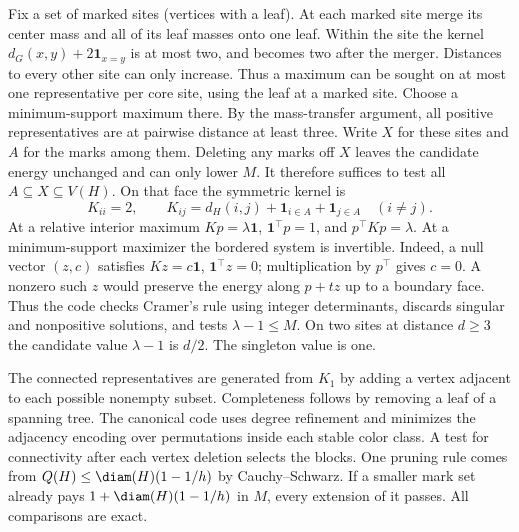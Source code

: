 \documentclass[11pt,a4paper]{article}
\begin{document}
Fix a set of marked sites (vertices with a leaf). At each marked site merge its center mass and all of its leaf masses onto one leaf. Within the site the kernel $d_G(x,y)+2\mathbf1_{x=y}$ is at most two, and becomes two after the merger. Distances to every other site can only increase. Thus a maximum can be sought on at most one representative per core site, using the leaf at a marked site. Choose a minimum-support maximum there. By the mass-transfer argument, all positive representatives are at pairwise distance at least three. Write $X$ for these sites and $A$ for the marks among them. Deleting any marks off $X$ leaves the candidate energy unchanged and can only lower $M$. It therefore suffices to test all $A\subseteq X\subseteq V(H)$. On that face the symmetric kernel is
\[
 K_{ii}=2,\qquad K_{ij}=d_H(i,j)+\mathbf1_{i\in A}+\mathbf1_{j\in A}\quad(i\ne j).
\]
At a relative interior maximum $Kp=\lambda\mathbf1$, $\mathbf1^\top p=1$, and $p^\top Kp=\lambda$. At a minimum-support maximizer the bordered system is invertible. Indeed, a null vector $(z,c)$ satisfies $Kz=c\mathbf1$, $\mathbf1^\top z=0$; multiplication by $p^\top$ gives $c=0$. A nonzero such $z$ would preserve the energy along $p+tz$ up to a boundary face. Thus the code checks Cramer's rule using integer determinants, discards singular and nonpositive solutions, and tests $\lambda-1\le M$. On two sites at distance $d\ge3$ the candidate value $\lambda-1$ is $d/2$. The singleton value is one.

The connected representatives are generated from $K_1$ by adding a vertex adjacent to each possible nonempty subset. Completeness follows by removing a leaf of a spanning tree. The canonical code uses degree refinement and minimizes the adjacency encoding over permutations inside each stable color class. A test for connectivity after each vertex deletion selects the blocks. One pruning rule comes from $Q(H)\le\diam(H)(1-1/h)$ by Cauchy--Schwarz. If a smaller mark set already pays $1+\diam(H)(1-1/h)$ in $M$, every extension of it passes. All comparisons are exact.
\end{document}

